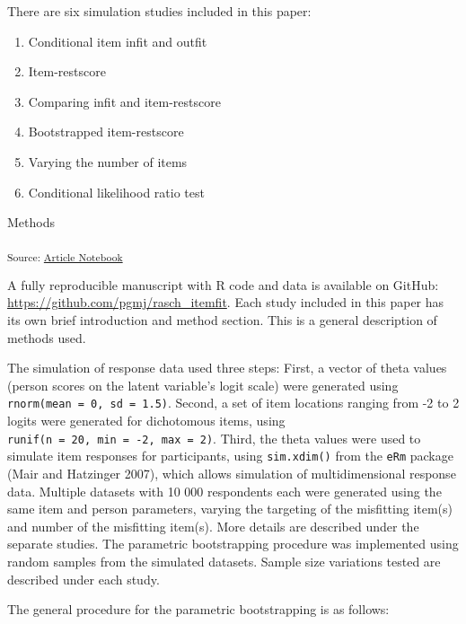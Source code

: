 \documentclass[
  letterpaper,
  DIV=11,
  numbers=noendperiod]{scrartcl}
\providecommand{\tightlist}{%
  \setlength{\itemsep}{0pt}\setlength{\parskip}{0pt}}\usepackage{longtable,booktabs,array}
\begin{document}
There are six simulation studies included in this paper:

\begin{enumerate}
\def\labelenumi{\arabic{enumi}.}
\tightlist
\item
  Conditional item infit and outfit
\item
  Item-restscore
\item
  Comparing infit and item-restscore
\item
  Bootstrapped item-restscore
\item
  Varying the number of items
\item
  Conditional likelihood ratio test
\end{enumerate}

Methods

\textsubscript{Source:
\href{https://pgmj.github.io/rasch_itemfit/index.qmd.html}{Article
Notebook}}

A fully reproducible manuscript with R code and data is available on
GitHub: \url{https://github.com/pgmj/rasch_itemfit}. Each study included
in this paper has its own brief introduction and method section. This is
a general description of methods used.

The simulation of response data used three steps: First, a vector of
theta values (person scores on the latent variable's logit scale) were
generated using \texttt{rnorm(mean\ =\ 0,\ sd\ =\ 1.5)}. Second, a set
of item locations ranging from -2 to 2 logits were generated for
dichotomous items, using
\texttt{runif(n\ =\ 20,\ min\ =\ -2,\ max\ =\ 2)}. Third, the theta
values were used to simulate item responses for participants, using
\texttt{sim.xdim()} from the \texttt{eRm} package (Mair and Hatzinger
2007), which allows simulation of multidimensional response data.
Multiple datasets with 10 000 respondents each were generated using the
same item and person parameters, varying the targeting of the misfitting
item(s) and number of the misfitting item(s). More details are described
under the separate studies. The parametric bootstrapping procedure was
implemented using random samples from the simulated datasets. Sample
size variations tested are described under each study.

The general procedure for the parametric bootstrapping is as follows:
\end{document}
